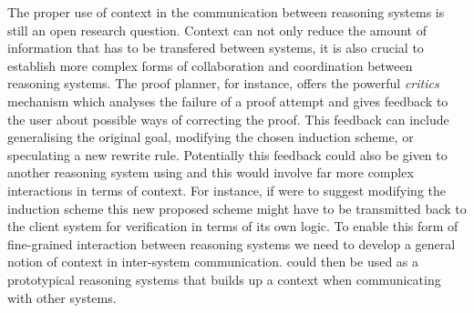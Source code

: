 
 
The proper use of context in the communication between reasoning
systems is still an open research question. Context can not only
reduce the amount of information that has to be transfered between
systems, it is also crucial to establish more complex forms of
collaboration and coordination between reasoning systems. The {\lclam}
proof planner, for instance, offers the powerful {\it critics}
mechanism which analyses the failure of a proof attempt and gives
feedback to the user about possible ways of correcting the proof.
This feedback can include generalising the original goal, modifying
the chosen induction scheme, or speculating a new rewrite rule.
Potentially this feedback could also be given to another reasoning
system using {\lclam} and this would involve far more complex
interactions in terms of context.  For instance, if {\lclam} were to
suggest modifying the induction scheme this new proposed scheme might
have to be transmitted back to the client system for verification in
terms of its own logic. To enable this form of fine-grained
interaction between reasoning systems we need to develop a general
notion of context in inter-system communication.  {\lclam} could then
be used as a prototypical reasoning systems that builds up a context
when communicating with other systems.
 





